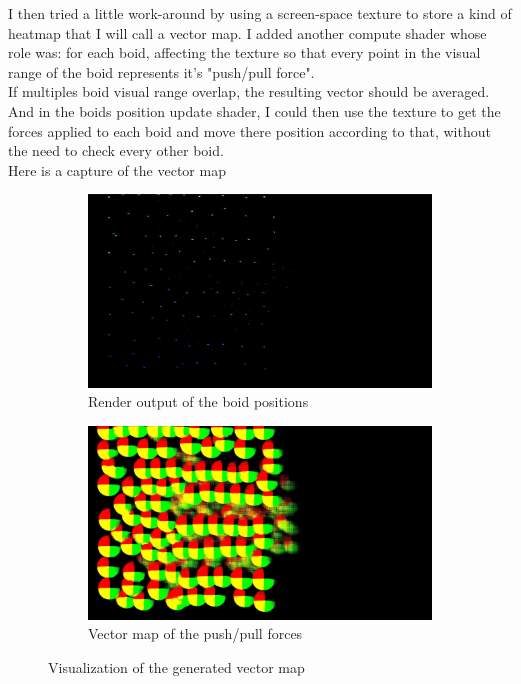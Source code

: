 \documentclass{article}
\begin{document}
I then tried a little work-around by using a screen-space texture to store a kind of heatmap that I will call a vector map. I added another compute shader whose role was: for each boid, affecting the texture so that every point in the visual range of the boid represents it's "push/pull force".\\
If multiples boid visual range overlap, the resulting vector should be averaged.\\
And in the boids position update shader, I could then use the texture to get the forces applied to each boid and move there position according to that, without the need to check every other boid.\\
Here is a capture of the vector map
\begin{figure}[H]
    \centering
    \begin{subfigure}[H]{\textwidth}
        \centering
        \includegraphics[width=.9\linewidth]{boids_vector_map.jpg}
        \caption{Render output of the boid positions}
    \end{subfigure}
    \begin{subfigure}[H]{\textwidth}
        \centering
        \includegraphics[width=.9\linewidth]{vector_map.jpg}
        \caption{Vector map of the push/pull forces}
    \end{subfigure}
    \caption{Visualization of the generated vector map}
\end{figure}
\end{document}

